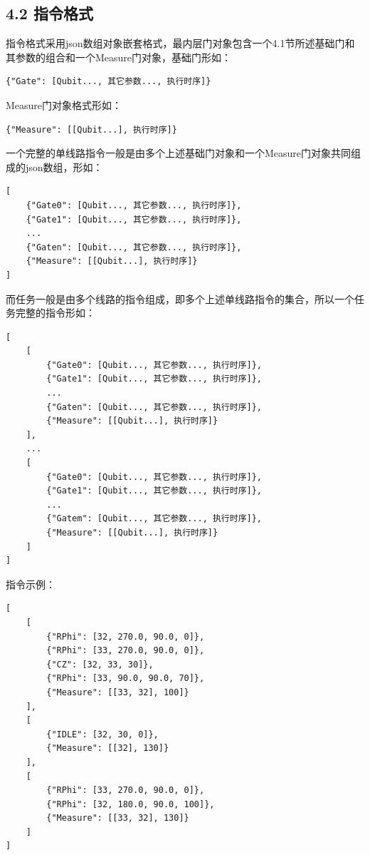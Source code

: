 \documentclass{ctexart}
\begin{document}
\subsection{4.2 指令格式}

指令格式采用json数组对象嵌套格式，最内层门对象包含一个4.1节所述基础门和其参数的组合和一个Measure门对象，基础门形如：

\begin{verbatim}{"Gate": [Qubit..., 其它参数..., 执行时序]}\end{verbatim}
Measure门对象格式形如：
\begin{verbatim}{"Measure": [[Qubit...], 执行时序]}\end{verbatim}
一个完整的单线路指令一般是由多个上述基础门对象和一个Measure门对象共同组成的json数组，形如：
\begin{verbatim}[
    {"Gate0": [Qubit..., 其它参数..., 执行时序]},
    {"Gate1": [Qubit..., 其它参数..., 执行时序]},
    ...
    {"Gaten": [Qubit..., 其它参数..., 执行时序]},
    {"Measure": [[Qubit...], 执行时序]}
]\end{verbatim}
而任务一般是由多个线路的指令组成，即多个上述单线路指令的集合，所以一个任务完整的指令形如：
\begin{verbatim}[
    [
        {"Gate0": [Qubit..., 其它参数..., 执行时序]},
        {"Gate1": [Qubit..., 其它参数..., 执行时序]},
        ...
        {"Gaten": [Qubit..., 其它参数..., 执行时序]},
        {"Measure": [[Qubit...], 执行时序]}
    ],
    ...
    [
        {"Gate0": [Qubit..., 其它参数..., 执行时序]},
        {"Gate1": [Qubit..., 其它参数..., 执行时序]},
        ...
        {"Gatem": [Qubit..., 其它参数..., 执行时序]},
        {"Measure": [[Qubit...], 执行时序]}
    ]
]\end{verbatim}

指令示例：

\begin{verbatim}[
    [
        {"RPhi": [32, 270.0, 90.0, 0]},
        {"RPhi": [33, 270.0, 90.0, 0]},
        {"CZ": [32, 33, 30]},
        {"RPhi": [33, 90.0, 90.0, 70]},
        {"Measure": [[33, 32], 100]}
    ],
    [
        {"IDLE": [32, 30, 0]},
        {"Measure": [[32], 130]}
    ],
    [
        {"RPhi": [33, 270.0, 90.0, 0]},
        {"RPhi": [32, 180.0, 90.0, 100]},
        {"Measure": [[33, 32], 130]}
    ]
]\end{verbatim}
\end{document}
